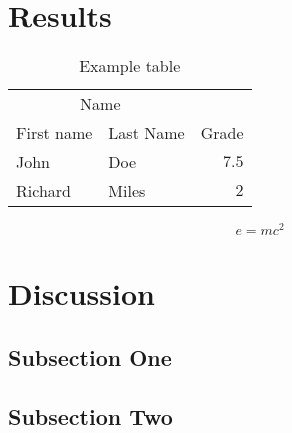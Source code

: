 \documentclass[twoside]{article}
\begin{document}
\begin{multicols}{2}
\section{Results}

\begin{table}[H]
\caption{Example table}
\centering
\begin{tabular}{llr}
\toprule
\multicolumn{2}{c}{Name} \\
\cmidrule(r){1-2}
First name & Last Name & Grade \\
\midrule
John & Doe & $7.5$ \\
Richard & Miles & $2$ \\
\bottomrule
\end{tabular}
\end{table}

\lipsum[5] %

\begin{equation}
\label{eq:emc}
e = mc^2
\end{equation}

\lipsum[6] %



\section{Discussion}

\subsection{Subsection One}

\lipsum[7] %

\subsection{Subsection Two}

\lipsum[8] %










\end{multicols}
\end{document}
